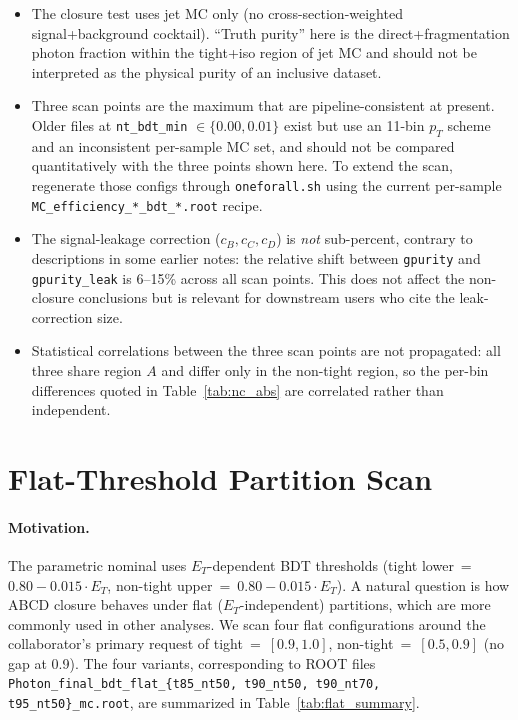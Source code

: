 \documentclass[11pt]{article}
\begin{document}
\begin{itemize}
  \item The closure test uses jet MC only (no cross-section-weighted signal+background cocktail). ``Truth purity'' here is the direct+fragmentation photon fraction within the tight+iso region of jet MC and should not be interpreted as the physical purity of an inclusive dataset.
  \item Three scan points are the maximum that are pipeline-consistent at present. Older files at \texttt{nt\_bdt\_min} $\in \{0.00, 0.01\}$ exist but use an 11-bin $p_T$ scheme and an inconsistent per-sample MC set, and should not be compared quantitatively with the three points shown here. To extend the scan, regenerate those configs through \texttt{oneforall.sh} using the current per-sample \texttt{MC\_efficiency\_*\_bdt\_*.root} recipe.
  \item The signal-leakage correction ($c_B, c_C, c_D$) is \emph{not} sub-percent, contrary to descriptions in some earlier notes: the relative shift between \texttt{gpurity} and \texttt{gpurity\_leak} is 6--15\% across all scan points. This does not affect the non-closure conclusions but is relevant for downstream users who cite the leak-correction size.
  \item Statistical correlations between the three scan points are not propagated: all three share region $A$ and differ only in the non-tight region, so the per-bin differences quoted in Table~\ref{tab:nc_abs} are correlated rather than independent.
\end{itemize}

\section{Flat-Threshold Partition Scan}

\paragraph{Motivation.}
The parametric nominal uses $E_T$-dependent BDT thresholds (tight lower~=~$0.80 - 0.015 \cdot E_T$, non-tight upper~=~$0.80 - 0.015 \cdot E_T$). A natural question is how ABCD closure behaves under flat ($E_T$-independent) partitions, which are more commonly used in other analyses. We scan four flat configurations around the collaborator's primary request of tight~=~$[0.9, 1.0]$, non-tight~=~$[0.5, 0.9]$ (no gap at 0.9). The four variants, corresponding to ROOT files
\texttt{Photon\_final\_bdt\_flat\_\{t85\_nt50, t90\_nt50, t90\_nt70,
t95\_nt50\}\_mc.root},
are summarized in Table~\ref{tab:flat_summary}.
\end{document}
